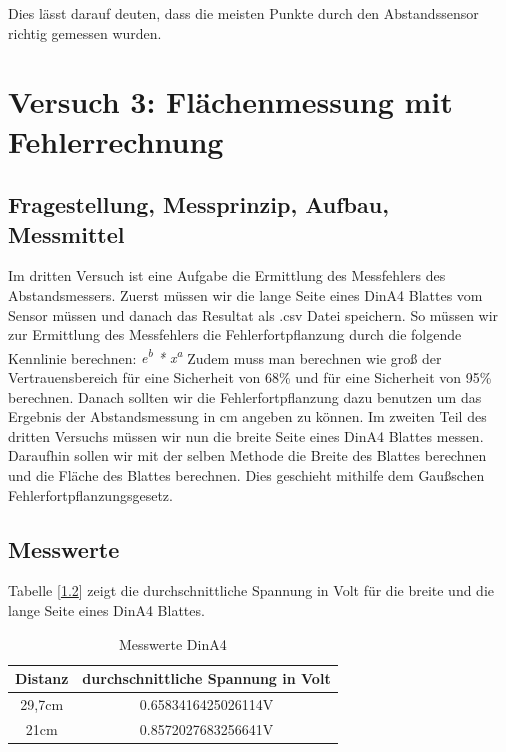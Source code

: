\documentclass[12pt, oneside, a4paper, \docLanguage]{report}
\begin{document}
Dies lässt darauf deuten, dass die meisten Punkte durch den Abstandssensor richtig gemessen wurden.
%
%
\chapter{Versuch 3: Flächenmessung mit Fehlerrechnung}
\label{chap:VERSUCH_3}

\section{Fragestellung, Messprinzip, Aufbau, Messmittel}
\label{chap:VERSUCH_3_FRAGESTELLUNG}
Im dritten Versuch ist eine Aufgabe die Ermittlung des Messfehlers des Abstandsmessers. Zuerst müssen wir die lange Seite eines DinA4 Blattes vom Sensor müssen und danach das Resultat als  .csv Datei speichern. 
\newline
So müssen wir zur Ermittlung des Messfehlers die Fehlerfortpflanzung durch die folgende Kennlinie berechnen: 
\newline
\textit{e\textsuperscript{b} *  x\textsuperscript{a}}
Zudem muss man berechnen wie groß der Vertrauensbereich für eine Sicherheit von 68\% und für eine Sicherheit von 95\% berechnen. Danach sollten wir die Fehlerfortpflanzung dazu benutzen um das Ergebnis der Abstandsmessung in cm angeben zu können.
\newline
\newline
Im zweiten Teil des dritten Versuchs müssen wir nun die breite Seite eines DinA4 Blattes messen. Daraufhin sollen wir mit der selben Methode die Breite des Blattes berechnen und die Fläche des Blattes berechnen. Dies geschieht mithilfe dem Gaußschen Fehlerfortpflanzungsgesetz.
\newpage
\section{Messwerte}
\label{chap:VERSUCH_3_MESSWERTE}
Tabelle [\ref{chap:VERSUCH_3_MESSWERTE}] zeigt die durchschnittliche Spannung in Volt für die breite und die lange Seite eines DinA4 Blattes.
\begin{table}[H]
	\centering\small
	\begin{tabular}{|c|c|}
		\hline
		Distanz &  durchschnittliche Spannung in Volt \\
		\hline
		29,7cm & 0.6583416425026114V \\
		\hline
		21cm & 0.8572027683256641V \\
		\hline
	\end{tabular}
	\caption{Messwerte DinA4}
	\label{fig:VERSUCH_3_MESSWERTE_DINA4}
\end{table}
\end{document}
